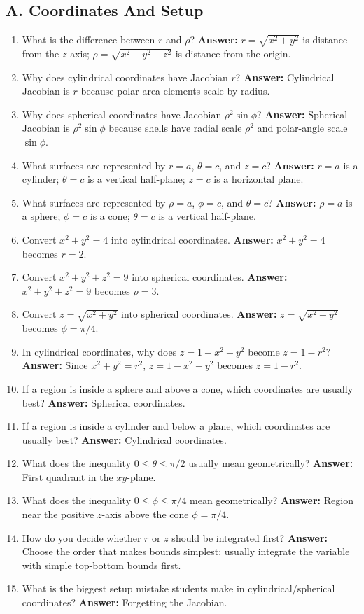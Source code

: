 \documentclass[11pt]{article}
\begin{document}
\subsection*{A. Coordinates And Setup}
\begin{enumerate}
\item What is the difference between $r$ and $\rho$? \textbf{Answer:} $r=\sqrt{x^2+y^2}$ is distance from the $z$-axis; $\rho=\sqrt{x^2+y^2+z^2}$ is distance from the origin.
\item Why does cylindrical coordinates have Jacobian $r$? \textbf{Answer:} Cylindrical Jacobian is $r$ because polar area elements scale by radius.
\item Why does spherical coordinates have Jacobian $\rho^2\sin\phi$? \textbf{Answer:} Spherical Jacobian is $\rho^2\sin\phi$ because shells have radial scale $\rho^2$ and polar-angle scale $\sin\phi$.
\item What surfaces are represented by $r=a$, $\theta=c$, and $z=c$? \textbf{Answer:} $r=a$ is a cylinder; $\theta=c$ is a vertical half-plane; $z=c$ is a horizontal plane.
\item What surfaces are represented by $\rho=a$, $\phi=c$, and $\theta=c$? \textbf{Answer:} $\rho=a$ is a sphere; $\phi=c$ is a cone; $\theta=c$ is a vertical half-plane.
\item Convert $x^2+y^2=4$ into cylindrical coordinates. \textbf{Answer:} $x^2+y^2=4$ becomes $r=2$.
\item Convert $x^2+y^2+z^2=9$ into spherical coordinates. \textbf{Answer:} $x^2+y^2+z^2=9$ becomes $\rho=3$.
\item Convert $z=\sqrt{x^2+y^2}$ into spherical coordinates. \textbf{Answer:} $z=\sqrt{x^2+y^2}$ becomes $\phi=\pi/4$.
\item In cylindrical coordinates, why does $z=1-x^2-y^2$ become $z=1-r^2$? \textbf{Answer:} Since $x^2+y^2=r^2$, $z=1-x^2-y^2$ becomes $z=1-r^2$.
\item If a region is inside a sphere and above a cone, which coordinates are usually best? \textbf{Answer:} Spherical coordinates.
\item If a region is inside a cylinder and below a plane, which coordinates are usually best? \textbf{Answer:} Cylindrical coordinates.
\item What does the inequality $0\le \theta\le \pi/2$ usually mean geometrically? \textbf{Answer:} First quadrant in the $xy$-plane.
\item What does the inequality $0\le \phi\le \pi/4$ mean geometrically? \textbf{Answer:} Region near the positive $z$-axis above the cone $\phi=\pi/4$.
\item How do you decide whether $r$ or $z$ should be integrated first? \textbf{Answer:} Choose the order that makes bounds simplest; usually integrate the variable with simple top-bottom bounds first.
\item What is the biggest setup mistake students make in cylindrical/spherical coordinates? \textbf{Answer:} Forgetting the Jacobian.
\end{enumerate}
\end{document}
